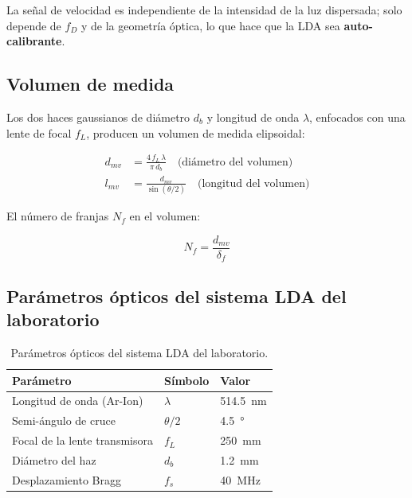 \documentclass[12pt,a4paper]{article}
\begin{document}
\noindent La señal de velocidad es independiente de la intensidad de la luz
dispersada; solo depende de $f_D$ y de la geometría óptica, lo que hace que
la LDA sea \textbf{auto-calibrante}.

\subsection{Volumen de medida}
\label{subsec:volumen}

Los dos haces gaussianos de diámetro $d_b$ y longitud de onda $\lambda$,
enfocados con una lente de focal $f_L$, producen un volumen de medida
elipsoidal:

\begin{align}
	d_{mv} & = \frac{4\,f_L\,\lambda}{\pi\,d_b}
	\quad\text{(diámetro del volumen)}
	\label{eq:dmv}                              \\
	l_{mv} & = \frac{d_{mv}}{\sin(\theta/2)}
	\quad\text{(longitud del volumen)}
	\label{eq:lmv}
\end{align}

El número de franjas $N_f$ en el volumen:

\begin{equation}
	N_f = \frac{d_{mv}}{\delta_f}
	\label{eq:Nf}
\end{equation}

\subsection{Parámetros ópticos del sistema LDA del laboratorio}
\label{subsec:params}

\begin{table}[H]
	\centering
	\caption{Parámetros ópticos del sistema LDA del laboratorio.}
	\label{tab:params_LDA}
	\begin{tabular}{lll}
		\toprule
		\textbf{Parámetro}            & \textbf{Símbolo}
		                              & \textbf{Valor}    \\
		\midrule
		Longitud de onda (Ar-Ion)     & $\lambda$
		                              & \SI{514,5}{\nm}   \\
		Semi-ángulo de cruce          & $\theta/2$
		                              & \SI{4,5}{\degree} \\
		Focal de la lente transmisora & $f_L$
		                              & \SI{250}{\mm}     \\
		Diámetro del haz              & $d_b$
		                              & \SI{1,2}{\mm}     \\
		Desplazamiento Bragg          & $f_s$
		                              & \SI{40}{\MHz}     \\
		\bottomrule
	\end{tabular}
\end{table}
\end{document}
